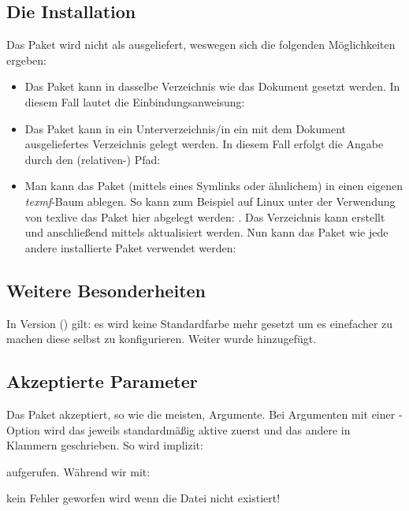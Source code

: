 \documentclass{sopra-base}
\begin{document}
\subsection{Die Installation}
    Das Paket wird nicht als  ausgeliefert, weswegen sich die
    folgenden Möglichkeiten ergeben:
    \begin{itemize}
        \item Das Paket kann in dasselbe Verzeichnis wie das Dokument
                gesetzt werden. In diesem Fall lautet die Einbindungsanweisung:
\begin{plainlatex}
\usepackage{sopra-attachments}
\end{plainlatex}
        \item Das Paket kann in ein Unterverzeichnis/in ein mit
                dem Dokument ausgeliefertes Verzeichnis gelegt werden. In
                diesem Fall erfolgt die Angabe durch den (relativen-) Pfad:
\begin{plainlatex}
\usepackage{./Mein/Pfad/zu/sopra-attachments}
\end{plainlatex}
        \item Man kann das Paket (mittels eines Symlinks oder ähnlichem)
              in einen eigenen \emph{texmf}-Baum ablegen.
              So kann zum Beispiel auf Linux unter der Verwendung von texlive
              das Paket hier abgelegt werden: .
              Das Verzeichnis kann erstellt und anschließend mittels
               aktualisiert werden. Nun kann
              das Paket wie jede andere installierte Paket verwendet werden:
\begin{plainlatex}
\usepackage{sopra-attachments}
\end{plainlatex}
    \end{itemize}

\subsection{Weitere Besonderheiten}
In Version \thesoaversion{} () gilt: es wird keine Standardfarbe mehr gesetzt um es einefacher zu machen diese selbst zu konfigurieren. Weiter wurde  hinzugefügt.

\subsection{Akzeptierte Parameter}
    Das Paket akzeptiert, so wie die meisten, Argumente.
    Bei Argumenten mit einer -Option wird das jeweils standardmäßig aktive zuerst und das andere in Klammern
    geschrieben. So wird implizit:
\begin{plainlatex}
    \usepackage[attsymbols,nodocheck,usefa]{sopra-attachments}
\end{plainlatex}
    aufgerufen. Während wir mit:
\begin{plainlatex}
    \usepackage[docheck]{sopra-attachments}
\end{plainlatex}
    kein Fehler geworfen wird wenn die Datei nicht existiert!
\end{document}
